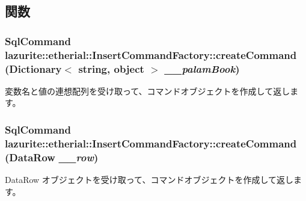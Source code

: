 \subsection{関数}
\hypertarget{classlazurite_1_1etherial_1_1_insert_command_factory_a0283f97acc2a08ba94318164d9bb20de}{
\subsubsection[{createCommand}]{\setlength{\rightskip}{0pt plus 5cm}SqlCommand lazurite::etherial::InsertCommandFactory::createCommand (Dictionary$<$ string, object $>$ {\em \_\-\_\-palamBook})}}
\label{classlazurite_1_1etherial_1_1_insert_command_factory_a0283f97acc2a08ba94318164d9bb20de}
変数名と値の連想配列を受け取って、コマンドオブジェクトを作成して返します。 \hypertarget{classlazurite_1_1etherial_1_1_insert_command_factory_a3b7a7b125dcbd2831a351b4a0bdc901f}{
\subsubsection[{createCommand}]{\setlength{\rightskip}{0pt plus 5cm}SqlCommand lazurite::etherial::InsertCommandFactory::createCommand (DataRow {\em \_\-\_\-row})}}
\label{classlazurite_1_1etherial_1_1_insert_command_factory_a3b7a7b125dcbd2831a351b4a0bdc901f}
DataRow オブジェクトを受け取って、コマンドオブジェクトを作成して返します。 

